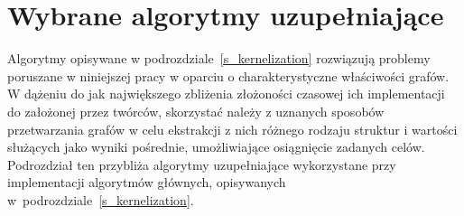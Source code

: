 \section{Wybrane algorytmy uzupełniające}\label{s_supplementary_algorithms}
\par{
  Algorytmy opisywane w podrozdziale~\ref{s_kernelization} rozwiązują problemy poruszane w niniejszej pracy w oparciu o charakterystyczne właściwości grafów.
  W dążeniu do jak największego zbliżenia złożoności czasowej ich implementacji do założonej przez twórców, skorzystać należy z uznanych sposobów przetwarzania grafów w celu ekstrakcji z nich różnego rodzaju struktur i wartości służących jako wyniki pośrednie, umożliwiające osiągnięcie zadanych celów.
  Podrozdział ten przybliża algorytmy uzupełniające wykorzystane przy implementacji algorytmów głównych, opisywanych w~podrozdziale~\ref{s_kernelization}.
}


